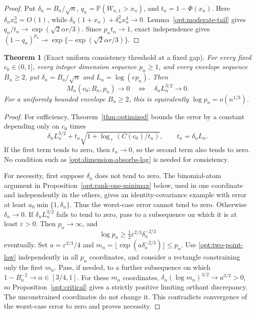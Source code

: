 \documentclass[11pt,a4paper]{article}
\newtheorem{theorem}{Theorem}
\theoremstyle{remark}
\newcommand{\Pp}{\mathbb P}
\begin{document}
\begin{proof}
Put \(\delta_n=B_n/\sqrt n\), \(q_n=\Pp(W_{n,1}>x_n)\), and
\(t_n=1-\Phi(x_n)\). Here \(\delta_nx_n^3=O(1)\), while
\(\delta_n(1+x_n)+\delta_n^2x_n^4\to0\).
Lemma~\ref{opt:moderate-tail} gives
\(q_n/t_n\to\exp(\sqrt2\alpha r/3)\). Since \(p_nt_n\to1\), exact
independence gives
\((1-q_n)^{p_n}\to\exp\{-\exp(\sqrt2\alpha r/3)\}\).
\end{proof}

\begin{theorem}[Exact uniform consistency threshold at a fixed gap]
\label{opt:consistency}
For every fixed \(c_0\in(0,1]\), every integer dimension sequence
\(p_n\ge1\), and every envelope sequence \(B_n\ge2\), put
\(\delta_n=B_n/\sqrt n\) and \(L_n=\log(ep_n)\). Then
\begin{equation}
 M_n(c_0;B_n,p_n)\longrightarrow0
 \quad\Longleftrightarrow\quad
 \delta_nL_n^{3/2}\longrightarrow0.
 \label{opt:consistency-iff}
\end{equation}
For a uniformly bounded envelope \(B_n\ge2\), this is equivalently
\(\log p_n=o(n^{1/3})\).
\end{theorem}

\begin{proof}
For sufficiency, Theorem~\ref{thm:optimized} bounds the error by a
constant depending only on \(c_0\) times
\[
 \delta_nL_n^{3/2}
 +t_n\sqrt{1+\log_+(C(c_0)/t_n)},\qquad t_n=\delta_nL_n.
\]
If the first term tends to zero, then \(t_n\to0\), so the second term
also tends to zero. No condition such as
\eqref{opt:dimension-absorbs-log} is needed for consistency.

For necessity, first suppose \(\delta_n\) does not tend to zero.
The binomial-atom argument in
Proposition~\ref{opt:rank-one-minimax} below, used in one coordinate
and independently in the others, gives an identity-covariance example
with error at least \(a_0\min\{1,\delta_n\}\). Thus the worst-case error
cannot tend to zero. Otherwise \(\delta_n\to0\). If
\(\delta_nL_n^{3/2}\) fails to tend to zero, pass to a subsequence on
which it is at least \(\varepsilon>0\). Then \(p_n\to\infty\), and
\[
 \log p_n\ge\tfrac12\varepsilon^{2/3}\delta_n^{-2/3}
\]
eventually. Set \(a=\varepsilon^{2/3}/4\) and
\(m_n=\lfloor\exp(a\delta_n^{-2/3})\rfloor\le p_n\).
Use \eqref{opt:two-point-law} independently in all \(p_n\) coordinates,
and consider a rectangle constraining only the first \(m_n\).
Pass, if needed, to a further subsequence on which
\(1-B_n^{-2}\to\alpha\in[3/4,1]\). For these \(m_n\) coordinates,
\(\delta_n(\log m_n)^{3/2}\to a^{3/2}>0\), so
Proposition~\ref{opt:critical} gives a strictly positive limiting
orthant discrepancy. The unconstrained coordinates do not change it.
This contradicts convergence of the worst-case error to zero and proves
necessity.
\end{proof}
\end{document}
